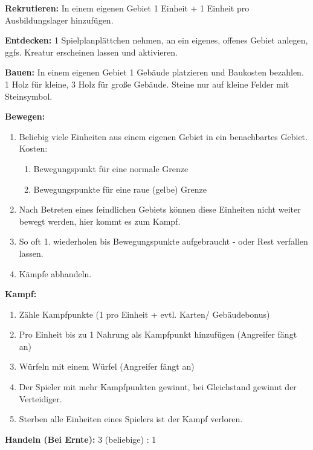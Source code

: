 \documentclass[fontsize=6pt]{scrreprt}
\begin{document}
  \textbf{Rekrutieren:}
  In einem eigenen Gebiet 1 Einheit + 1 Einheit pro Ausbildungslager hinzufügen.

  \textbf{Entdecken:}
  1 Spielplanplättchen nehmen, an ein eigenes, offenes Gebiet anlegen, ggfs. Kreatur erscheinen lassen und aktivieren.

  \textbf{Bauen:}
  In einem eigenen Gebiet 1 Gebäude platzieren und Baukosten bezahlen. 1 Holz für kleine, 3 Holz für große Gebäude. Steine nur auf kleine Felder mit Steinsymbol.

  \textbf{Bewegen:}
  \begin{enumerate}[topsep=1pt, partopsep=0pt, parsep=0pt, itemsep=0pt, leftmargin=12pt]
    \item Beliebig viele Einheiten aus einem eigenen Gebiet in ein benachbartes Gebiet. Kosten:
    \begin{enumerate}[label=\textbf{\arabic*x}, topsep=0pt, partopsep=0pt, parsep=0pt, itemsep=0pt, leftmargin=10pt]
      \item Bewegungspunkt für eine normale Grenze
      \item Bewegungspunkte für eine raue (gelbe) Grenze
    \end{enumerate}
    \item Nach Betreten eines feindlichen Gebiets können diese Einheiten nicht weiter bewegt werden, hier kommt es zum Kampf.
    \item So oft 1. wiederholen bis Bewegungspunkte aufgebraucht - oder Rest verfallen lassen.
    \item Kämpfe abhandeln.
  \end{enumerate}

  \textbf{Kampf:}
  \begin{enumerate}[topsep=1pt, partopsep=0pt, parsep=0pt, itemsep=0pt, leftmargin=12pt]
    \item Zähle Kampfpunkte (1 pro Einheit + evtl. Karten/ Gebäudebonus)
    \item Pro Einheit bis zu 1 Nahrung als Kampfpunkt hinzufügen (Angreifer fängt an)
    \item Würfeln mit einem Würfel (Angreifer fängt an)
    \item Der Spieler mit mehr Kampfpunkten gewinnt, bei Gleichstand gewinnt der Verteidiger.
    \item Sterben alle Einheiten eines Spielers ist der Kampf verloren.
  \end{enumerate}

  \textbf{Handeln (Bei Ernte):} 3 (beliebige) : 1
\end{document}
